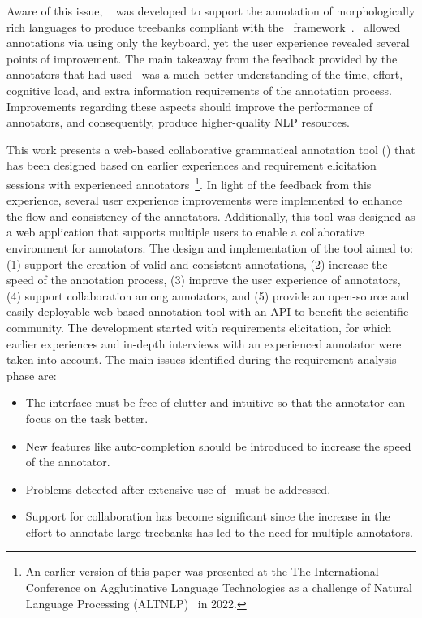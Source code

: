 Aware of this issue, \boatvone~\cite{anon} was developed to support the annotation of morphologically rich languages to produce treebanks compliant with the \ud\ framework~\cite{ud}.
\boatvone\ allowed annotations via using only the keyboard, yet the user experience revealed several points of improvement.
The main takeaway from the feedback provided by the annotators that had used \boatvone\ was a much better understanding of the time, effort, cognitive load, and extra information requirements of the annotation process.
Improvements regarding these aspects should improve the performance of annotators, and consequently, produce higher-quality NLP resources.

This work presents a web-based collaborative grammatical annotation tool (\boatvtwo) that has been designed based on earlier experiences and requirement elicitation sessions with experienced annotators~\footnote{An earlier version of this paper was presented at the The International Conference on Agglutinative Language Technologies as a challenge of Natural Language Processing (ALTNLP)~\cite{altnlp} in 2022.}.
In light of the feedback from this experience, several user experience improvements were implemented to enhance the flow and consistency of the annotators.
Additionally, this tool was designed as a web application that supports multiple users to enable a collaborative environment for annotators.
The design and implementation of the tool aimed to: (1) support the creation of valid and consistent annotations, (2) increase the speed of the annotation process, (3) improve the user experience of annotators, (4) support collaboration among annotators, and (5) provide an open-source and easily deployable web-based annotation tool with an API to benefit the scientific community.
The development started with requirements elicitation, for which earlier experiences and in-depth interviews with an experienced annotator were taken into account.
The main issues identified during the requirement analysis phase are:
\begin{itemize}
\setlength\itemsep{0em}
\item The interface must be free of clutter and intuitive so that the annotator can focus on the task better.
\item New features like auto-completion should be introduced to increase the speed of the annotator.
\item Problems detected after extensive use of \boatvone\ must be addressed.
\item Support for collaboration has become significant since the increase in the effort to annotate large treebanks has led to the need for multiple annotators.
\end{itemize}

